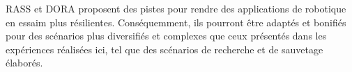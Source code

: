 \ac{RASS} et \ac{DORA} proposent des pistes pour rendre des applications de robotique en essaim plus résilientes. Conséquemment, ils pourront être adaptés et bonifiés pour des scénarios plus diversifiés et complexes que ceux présentés dans les expériences réalisées ici, tel que des scénarios de recherche et de sauvetage élaborés.



